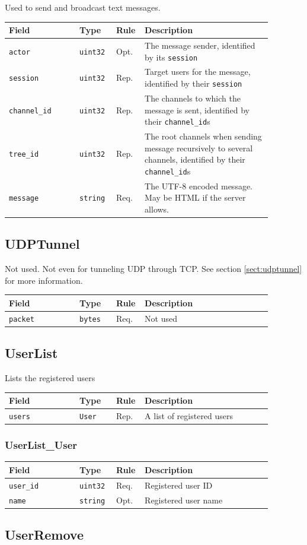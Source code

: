 \documentclass[11pt]{article} %
\newenvironment{mumbleMessageEx}
{%
	\small
	\renewcommand\arraystretch{1.5}
	\begin{tabular}{p{0.25\linewidth}p{0.13\linewidth}p{0.05\linewidth}p{0.45\linewidth}}
	Field & Type & Rule & Description \\
	\hline
}
{%
	\end{tabular}
	\renewcommand\arraystretch{1.0}
}
\newcommand{\mumbleMessageExItem}[4]{ \texttt{#1} & \texttt{#2} & #3 & #4 \\ }
\begin{document}
Used to send and broadcast text messages.

\begin{mumbleMessageEx}
\mumbleMessageExItem{actor}{uint32}{Opt.}{The message sender, identified by its \texttt{session}}
\mumbleMessageExItem{session}{uint32}{Rep.}{Target users for the message, identified by their \texttt{session}}
\mumbleMessageExItem{channel\_id}{uint32}{Rep.}{The channels to which the message is sent, identified by their \texttt{channel\_id}s}
\mumbleMessageExItem{tree\_id}{uint32}{Rep.}{The root channels when sending message recursively to several channels, identified by their \texttt{channel\_id}s}
\mumbleMessageExItem{message}{string}{Req.}{The UTF-8 encoded message. May be HTML if the server allows.}
\end{mumbleMessageEx}

\subsection{UDPTunnel}
\label{msg:udpTunnel}

Not used. Not even for tunneling UDP through TCP. See section \ref{sect:udptunnel} for more information.

\begin{mumbleMessageEx}
\mumbleMessageExItem{packet}{bytes}{Req.}{Not used}
\end{mumbleMessageEx}

\subsection{UserList}
\label{msg:userList}

Lists the registered users

\begin{mumbleMessageEx}
\mumbleMessageExItem{users}{User}{Rep.}{A list of registered users}
\end{mumbleMessageEx}

\subsubsection{UserList\_User}
\label{msg:userList:user}

\begin{mumbleMessageEx}
\mumbleMessageExItem{user\_id}{uint32}{Req.}{Registered user ID}
\mumbleMessageExItem{name}{string}{Opt.}{Registered user name}
\end{mumbleMessageEx}

\subsection{UserRemove}
\label{msg:userRemove}
\end{document}
